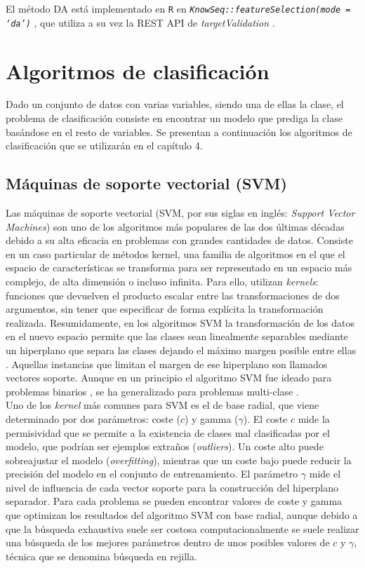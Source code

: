 El método DA  está implementado en \texttt{R}  en \textit{\texttt{KnowSeq::featureSelection(mode = `da')}} \cite{KnowSeq}, que utiliza a su vez la REST API de \textit{targetValidation} \cite{OpenTargets2020}.

\section{Algoritmos de clasificación}

Dado un conjunto de datos con varias variables, siendo una de ellas la clase, el problema de clasificación consiste en encontrar un modelo que prediga la clase basándose en el resto de variables. Se presentan a continuación los  algoritmos de clasificación que se utilizarán en el capítulo 4.

\subsection{Máquinas de soporte vectorial (SVM)}

Las máquinas de soporte vectorial (SVM, por sus siglas en inglés: \textit{Support Vector Machines}) son uno de los algoritmos más populares de las dos últimas décadas debido a su alta eficacia en problemas con grandes cantidades de datos. Consiste en un caso particular de métodos kernel, una familia de algoritmos en el que el espacio de características se transforma para ser representado en un espacio más complejo, de alta dimensión o incluso infinita. Para ello, utilizan \textit{kernels}: funciones que devuelven el producto escalar entre las transformaciones de dos argumentos, sin tener que especificar de forma explícita la transformación realizada. Resumidamente, en los algoritmos SVM la transformación de los datos en el nuevo espacio permite que las clases sean linealmente separables mediante un hiperplano que separa las clases dejando el máximo margen posible entre ellas \cite{Boser1992}. Aquellas instancias que limitan el margen de ese hiperplano son llamados vectores soporte. Aunque en un principio el algoritmo SVM fue ideado para problemas binarios \cite{Boser1992}, se ha generalizado para problemas multi-clase \cite{Duan2005}.\\

Uno de los \textit{kernel} más comunes para SVM es el de base radial, que viene determinado por dos parámetros: coste ($c$) y gamma ($\gamma$). El coste $c$ mide la permisividad que se permite a la existencia de clases mal clasificadas por el modelo, que podrían ser ejemplos extraños (\textit{outliers}). Un coste alto puede sobreajustar el modelo (\textit{overfitting}), mientras que un coste bajo puede reducir la precisión del modelo en el conjunto de entrenamiento. El parámetro $\gamma$ mide el nivel de influencia de cada vector soporte para la construcción del hiperplano separador. Para cada problema se pueden encontrar valores de coste y gamma que optimizan los resultados del algoritmo SVM con base radial, aunque debido a que la búsqueda exhaustiva suele ser costosa computacionalmente se suele realizar una búsqueda de los mejores parámetros dentro de unos posibles valores de $c$ y $\gamma$, técnica que se denomina búsqueda en rejilla.\\

